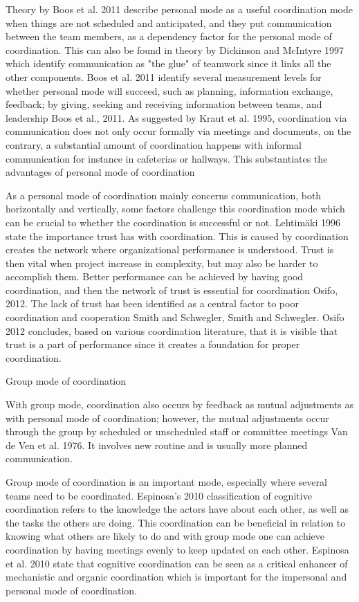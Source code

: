 Theory by Boos et al. 2011 describe personal mode as a useful coordination mode when things are not scheduled and anticipated, and they put communication between the team members, as a dependency factor for the personal mode of coordination. This can also be found in theory by Dickinson and McIntyre 1997 which identify communication as "the glue" of teamwork since it links all the other components. Boos et al. 2011 identify several measurement levels for whether personal mode will succeed, such as planning, information exchange, feedback; by giving, seeking and receiving information between teams, and leadership Boos et al., 2011. As suggested by Kraut et al. 1995, coordination via communication does not only occur formally via meetings and documents, on the contrary, a substantial amount of coordination happens with informal communication for instance in cafeterias or hallways. This substantiates the advantages of personal mode of coordination

As a personal mode of coordination mainly concerns communication, both horizontally and vertically, some factors challenge this coordination mode which can be crucial to whether the coordination is successful or not. Lehtimäki 1996 state the importance trust has with coordination. This is caused by coordination creates the network where organizational performance is understood. Trust is then vital when project increase in complexity, but may also be harder to accomplish them. Better performance can be achieved by having good coordination, and then the network of trust is essential for coordination Osifo, 2012. The lack of trust has been identified as a central factor to poor coordination and cooperation Smith and Schwegler, Smith and Schwegler. Osifo 2012 concludes, based on various coordination literature, that it is visible that trust is a part of performance since it creates a foundation for proper coordination.

Group mode of coordination

With group mode, coordination also occurs by feedback as mutual adjustments as with personal mode of coordination; however, the mutual adjustments occur through the group by scheduled or unscheduled staff or committee meetings Van de Ven et al. 1976. It involves new routine and is usually more planned communication.

Group mode of coordination is an important mode, especially where several teams need to be coordinated. Espinosa’s 2010 classification of cognitive coordination refers to the knowledge the actors have about each other, as well as the tasks the others are doing. This coordination can be beneficial in relation to knowing what others are likely to do and with group mode one can achieve coordination by having meetings evenly to keep updated on each other. Espinosa et al. 2010 state that cognitive coordination can be seen as a critical enhancer of mechanistic and organic coordination which is important for the impersonal and personal mode of coordination.


